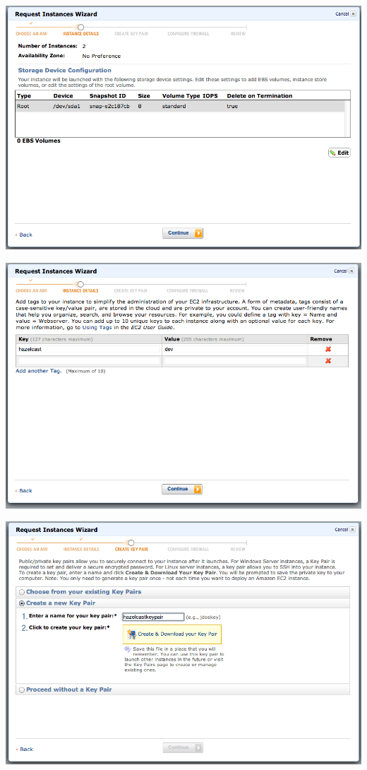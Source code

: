 \includegraphics[scale=0.30]{ec2-5.png}

\includegraphics[scale=0.30]{ec2-6.png}

\includegraphics[scale=0.30]{ec2-7.png}

